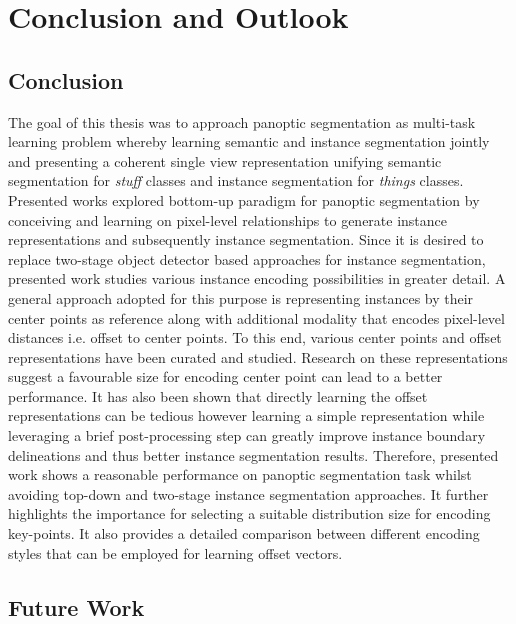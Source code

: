 
\chapter{Conclusion and  Outlook}
\label{sec:conclusion_future-work}


\section{Conclusion}

The goal of this thesis was to approach panoptic segmentation as multi-task learning problem whereby learning semantic and instance segmentation jointly and presenting a coherent single view representation unifying semantic segmentation for \textit{stuff} classes and instance segmentation for \textit{things} classes. Presented works explored bottom-up paradigm for panoptic segmentation by conceiving and learning on pixel-level relationships to generate instance representations and subsequently instance segmentation. Since it is desired to replace two-stage object detector based approaches for instance segmentation, presented work studies various instance encoding possibilities in greater detail. A general approach adopted for this purpose is representing instances by their center points as reference along with additional modality that encodes pixel-level distances i.e. offset to center points. To this end, various center points and offset representations have been curated and studied. Research on these representations suggest a favourable size for encoding center point can lead to a better performance. It has also been shown that directly learning the offset representations can be tedious however learning a simple representation while leveraging a brief post-processing step can greatly improve instance boundary delineations and thus better instance segmentation results. Therefore, presented work shows a reasonable performance on panoptic segmentation task whilst avoiding top-down and two-stage instance segmentation approaches. It further highlights the importance for selecting a suitable distribution size for encoding key-points. It also provides a detailed comparison between different encoding styles that can be employed for learning offset vectors. 


\section{Future Work}

